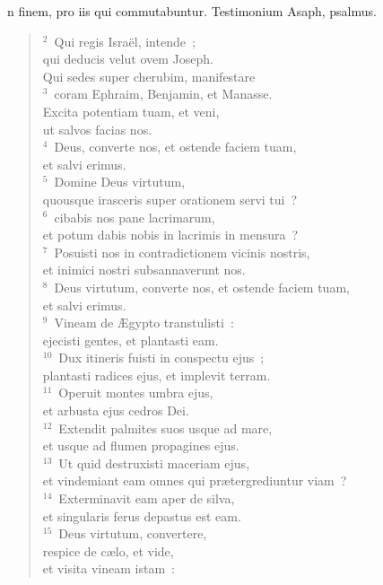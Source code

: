 \bchapter[Psalm]
n finem, pro iis qui commutabuntur. Testimonium Asaph, psalmus.
\begin{verse}${}^{2}$~Qui regis Isra\"el, intende~;\\ qui deducis velut ovem Joseph.\\ Qui sedes super cherubim, manifestare\\
${}^{3}$~coram Ephraim, Benjamin, et Manasse.\\ Excita potentiam tuam, et veni,\\ ut salvos facias nos.\\
${}^{4}$~Deus, converte nos, et ostende faciem tuam,\\ et salvi erimus.\\
${}^{5}$~Domine Deus virtutum,\\ quousque irasceris super orationem servi tui~?\\
${}^{6}$~cibabis nos pane lacrimarum,\\ et potum dabis nobis in lacrimis in mensura~?\\
${}^{7}$~Posuisti nos in contradictionem vicinis nostris,\\ et inimici nostri subsannaverunt nos.\\
${}^{8}$~Deus virtutum, converte nos, et ostende faciem tuam,\\ et salvi erimus.\\
${}^{9}$~Vineam de \AE gypto transtulisti~:\\ ejecisti gentes, et plantasti eam.\\
${}^{10}$~Dux itineris fuisti in conspectu ejus~;\\ plantasti radices ejus, et implevit terram.\\
${}^{11}$~Operuit montes umbra ejus,\\ et arbusta ejus cedros Dei.\\
${}^{12}$~Extendit palmites suos usque ad mare,\\ et usque ad flumen propagines ejus.\\
${}^{13}$~Ut quid destruxisti maceriam ejus,\\ et vindemiant eam omnes qui pr\ae tergrediuntur viam~?\\
${}^{14}$~Exterminavit eam aper de silva,\\ et singularis ferus depastus est eam.\\
${}^{15}$~Deus virtutum, convertere,\\ respice de c\ae lo, et vide,\\ et visita vineam istam~:\\

\end{verse}
